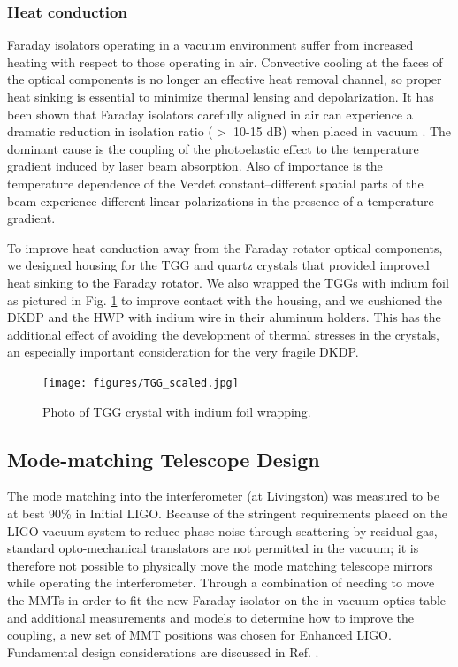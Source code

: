 \subsubsection{Heat conduction}
\label{sec:heatconduction}
Faraday isolators operating in a vacuum environment suffer from
increased heating with respect to those operating in air. Convective
cooling at the faces of the optical components is no longer an
effective heat removal channel, so proper heat sinking is essential to
minimize thermal lensing and depolarization. It has been shown that
Faraday isolators carefully aligned in air can experience a dramatic
reduction in isolation ratio ($>$ 10-15 dB) when placed in vacuum
\citep{TheVIRGOCollaboration2008Invacuum}. The dominant cause is the
coupling of the photoelastic effect to the temperature gradient
induced by laser beam absorption. Also of importance is the
temperature dependence of the Verdet constant--different spatial parts
of the beam experience different linear polarizations in the presence
of a temperature gradient.

To improve heat conduction away from the Faraday rotator optical
components, we designed housing for the TGG and quartz crystals that
provided improved heat sinking to the Faraday rotator. We also wrapped
the TGGs with indium foil as pictured in Fig. \ref{fig:TGG} to improve
contact with the housing, and we cushioned the DKDP and the HWP with
indium wire in their aluminum holders. This has the additional effect
of avoiding the development of thermal stresses in the crystals, an
especially important consideration for the very fragile DKDP.

\begin{figure}
\begin{centering}
\texttt{[image: figures/TGG\_scaled.jpg]}
\caption[Photo of an indium-wrapped TGG crystal]{Photo of TGG crystal
  with indium foil wrapping.}
\label{fig:TGG}
\end{centering}
\end{figure}


\subsection{Mode-matching Telescope Design}
The mode matching into the interferometer (at Livingston) was measured
to be at best 90\% in Initial LIGO. Because of the stringent
requirements placed on the LIGO vacuum system to reduce phase noise
through scattering by residual gas, standard opto-mechanical
translators are not permitted in the vacuum; it is therefore not
possible to physically move the mode matching telescope mirrors while
operating the interferometer. Through a combination of needing to move
the MMTs in order to fit the new Faraday isolator on the in-vacuum
optics table and additional measurements and models to determine how
to improve the coupling, a new set of MMT positions was chosen for
Enhanced LIGO. Fundamental design considerations are discussed in
Ref. \citep{Delker1997Design}.



